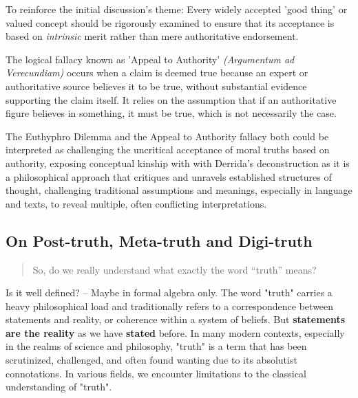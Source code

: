 \documentclass[11pt,a4]{article}
\begin{document}
    \par

    To reinforce the initial discussion's theme:
    Every widely accepted 'good thing' or valued concept
    should be rigorously examined
    to ensure that its acceptance is based on
    \textit{intrinsic} merit rather than
    mere authoritative endorsement.

    \par
    The  logical fallacy known as 'Appeal to Authority' \textit{(Argumentum ad
    Verecundiam)} occurs when a claim is deemed true because an expert or
    authoritative source believes it to be true, without substantial
    evidence supporting the claim itself.  It relies on the assumption
    that if an authoritative figure believes in something,
    it must be true, which is not necessarily the case.

    \par


    The Euthyphro Dilemma and the Appeal to Authority fallacy
    both could be interpreted as challenging the uncritical
    acceptance of moral truths based on authority, exposing
    conceptual kinship with with Derrida's
    deconstruction\cite{Deconstruction} as it is a philosophical
    approach that critiques and unravels
    established structures of thought, challenging traditional
    assumptions and meanings, especially in language and texts,
    to reveal multiple, often conflicting interpretations.





\subsection{On Post-truth, Meta-truth and Digi-truth}

    \begin{quote}
        So, do we really understand what exactly the word “truth” means?
    \end{quote}


    Is it well defined? -- Maybe in formal algebra only.
    The word "truth" carries a heavy philosophical load
    and traditionally refers to a correspondence between statements and reality,
    or coherence within a system of beliefs.
    But \textbf{statements are the reality} as we have \textbf{stated} before.
    In many modern contexts, especially in the realms of science and philosophy,
    "truth" is a term that has been scrutinized, challenged,
    and often found wanting due to its absolutist connotations.
    In various fields, we encounter limitations to the classical
    understanding of "truth".
\end{document}
